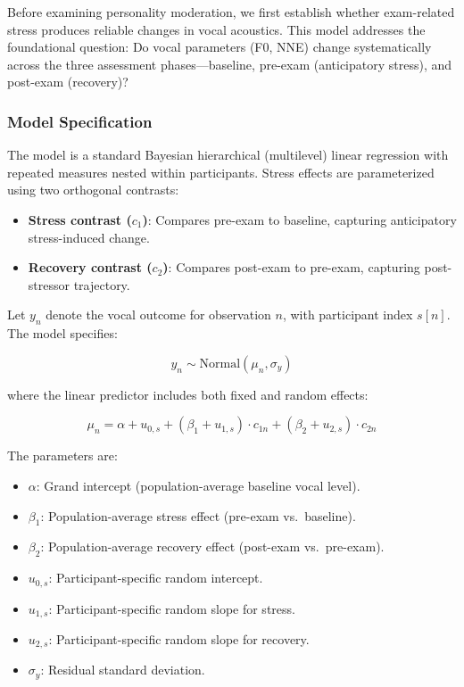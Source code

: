 \documentclass[
  english,
  man,floatsintext]{apa6}
\providecommand{\tightlist}{%
  \setlength{\itemsep}{0pt}\setlength{\parskip}{0pt}}
\begin{document}
Before examining personality moderation, we first establish whether exam-related stress produces reliable changes in vocal acoustics. This model addresses the foundational question: Do vocal parameters (F0, NNE) change systematically across the three assessment phases---baseline, pre-exam (anticipatory stress), and post-exam (recovery)?

\subsubsection{Model Specification}\label{model-specification}

The model is a standard Bayesian hierarchical (multilevel) linear regression with repeated measures nested within participants. Stress effects are parameterized using two orthogonal contrasts:

\begin{itemize}
\tightlist
\item
  \textbf{Stress contrast (\(c_1\))}: Compares pre-exam to baseline, capturing anticipatory stress-induced change.
\item
  \textbf{Recovery contrast (\(c_2\))}: Compares post-exam to pre-exam, capturing post-stressor trajectory.
\end{itemize}

Let \(y_n\) denote the vocal outcome for observation \(n\), with participant index \(s[n]\). The model specifies:

\[
y_n \sim \text{Normal}(\mu_n, \sigma_y)
\]

where the linear predictor includes both fixed and random effects:

\[
\mu_n = \alpha + u_{0,s} + (\beta_1 + u_{1,s}) \cdot c_{1n} + (\beta_2 + u_{2,s}) \cdot c_{2n}
\]

The parameters are:

\begin{itemize}
\tightlist
\item
  \(\alpha\): Grand intercept (population-average baseline vocal level).
\item
  \(\beta_1\): Population-average stress effect (pre-exam vs.~baseline).
\item
  \(\beta_2\): Population-average recovery effect (post-exam vs.~pre-exam).
\item
  \(u_{0,s}\): Participant-specific random intercept.
\item
  \(u_{1,s}\): Participant-specific random slope for stress.
\item
  \(u_{2,s}\): Participant-specific random slope for recovery.
\item
  \(\sigma_y\): Residual standard deviation.
\end{itemize}
\end{document}
